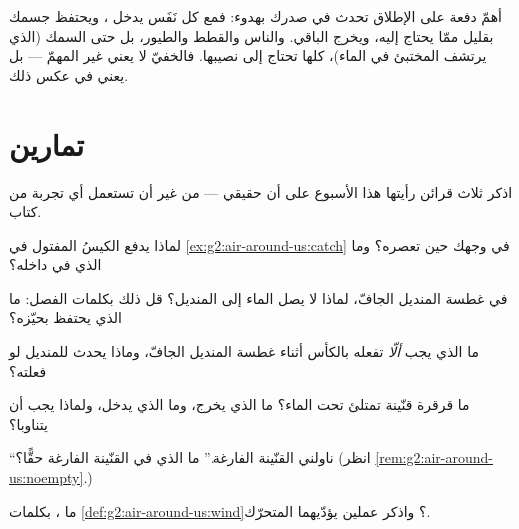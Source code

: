 \begin{remark}\label{rem:g2:air-around-us:breathe}
أهمّ دفعة على الإطلاق تحدث في صدرك بهدوء: فمع كل نَفَس يدخل
، ويحتفظ جسمك بقليل ممّا يحتاج إليه، ويخرج الباقي. والناس
والقطط والطيور، بل حتى السمك (الذي يرتشف  المختبئ في
الماء)، كلها تحتاج إلى نصيبها. فالخفيّ لا يعني غير المهمّ ---
بل يعني في  عكس ذلك.
\end{remark}

\section{تمارين}

\begin{exercise}[$\star$]\label{exo:g2:air-around-us:1}
اذكر ثلاث قرائن رأيتها هذا الأسبوع على أن  حقيقي --- من
غير أن تستعمل أي تجربة من كتاب.
\end{exercise}

\begin{exercise}[$\star$]\label{exo:g2:air-around-us:2}
لماذا يدفع الكيسُ المفتول في \cref{ex:g2:air-around-us:catch} في
وجهك حين تعصره؟ وما الذي في داخله؟
\end{exercise}

\begin{exercise}[$\star$]\label{exo:g2:air-around-us:3}
في غطسة المنديل الجافّ، لماذا لا يصل الماء إلى المنديل؟ قل ذلك
بكلمات الفصل: ما الذي يحتفظ بحيّزه؟
\end{exercise}

\begin{exercise}[$\star$]\label{exo:g2:air-around-us:4}
ما الذي يجب \emph{ألّا} تفعله بالكأس أثناء غطسة المنديل الجافّ،
وماذا يحدث للمنديل لو فعلته؟
\end{exercise}

\begin{exercise}[$\star$]\label{exo:g2:air-around-us:5}
ما قرقرة قنّينة تمتلئ تحت الماء؟ ما الذي يخرج، وما الذي يدخل،
ولماذا يجب أن يتناوبا؟
\end{exercise}

\begin{exercise}[$\star$]\label{exo:g2:air-around-us:6}
``ناولني القنّينة الفارغة.'' ما الذي في القنّينة الفارغة حقًّا؟
(انظر \cref{rem:g2:air-around-us:noempty}.)
\end{exercise}

\begin{exercise}[$\star$]\label{exo:g2:air-around-us:7}
ما ، بكلمات \cref{def:g2:air-around-us:wind}؟ واذكر عملين
يؤدّيهما  المتحرّك.
\end{exercise}

